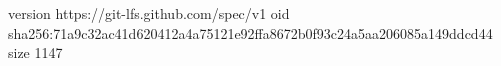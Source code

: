 version https://git-lfs.github.com/spec/v1
oid sha256:71a9c32ac41d620412a4a75121e92ffa8672b0f93c24a5aa206085a149ddcd44
size 1147
